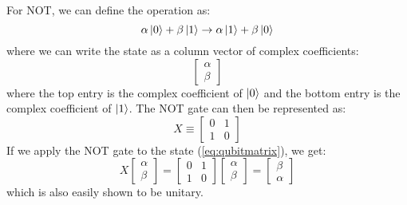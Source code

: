 \documentclass[reqno]{amsart}
\numberwithin{equation}{section}
\numberwithin{figure}{section}
\begin{document}
\begin{justify}
For NOT, we can define the operation as:
    \begin{equation}
        \alpha\ket{0} + \beta\ket{1} \rightarrow \alpha\ket{1} + \beta\ket{0}
    \end{equation}
where we can write the state as a column vector of complex coefficients:
    \begin{equation}
        \begin{bmatrix}
            \alpha \\
            \beta
        \end{bmatrix}
        \label{eq:qubitmatrix}
    \end{equation}
where the top entry is the complex coefficient of $\ket{0}$ and the bottom entry is the complex coefficient of $\ket{1}$. The NOT gate can then be represented as:
    \begin{equation}
        X \equiv \begin{bmatrix}
                    0 & 1 \\
                    1 & 0
                \end{bmatrix}
                \label{eq:NOTmatrix}
    \end{equation}
If we apply the NOT gate to the state (\ref{eq:qubitmatrix}), we get:
    \begin{equation}
        X\begin{bmatrix}
            \alpha \\
            \beta
        \end{bmatrix} = \begin{bmatrix}
                            0 & 1 \\
                            1 & 0
                        \end{bmatrix}\begin{bmatrix}
                                        \alpha \\
                                        \beta
                                    \end{bmatrix} = \begin{bmatrix}
                                                        \beta \\
                                                        \alpha
                                                    \end{bmatrix}
    \end{equation}
which is also easily shown to be unitary. \\


\end{justify}
\end{document}
